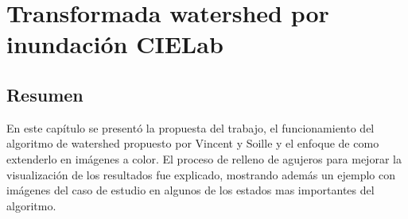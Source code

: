 \chapter{Transformada watershed por inundación CIELab}
\label{chap:watershed}



\section{Resumen}

En este capítulo se presentó la propuesta del trabajo, el funcionamiento del algoritmo de watershed propuesto por Vincent y Soille y el enfoque de como extenderlo en imágenes a color. El proceso de relleno de agujeros para mejorar la visualización de los resultados fue explicado, mostrando además un ejemplo con imágenes del caso de estudio en algunos de los estados mas importantes del algoritmo.
